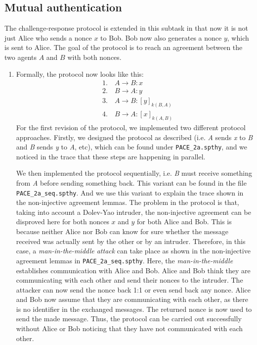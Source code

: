 \documentclass[a4paper,11pt]{scrartcl}
\begin{document}
\subsection{Mutual authentication}
The challenge-response protocol is extended in this subtask in that now it is not just Alice who sends a nonce $x$ to Bob.  Bob now also generates a nonce $y$,  which is sent to Alice. The goal of the protocol is to reach an agreement between the two agents $A$ and $B$ with both nonces.
\begin{enumerate}[label=\alph*)]
	\item Formally, the protocol now looks like this:
\begin{align*}
&\text{1.} \quad A \rightarrow B: x\\
&\text{2.} \quad B \rightarrow A: y\\
&\text{3.} \quad A \rightarrow B: [y]_{k(B,A)}\\
&\text{4.} \quad B \rightarrow A: [x]_{k(A,B)}
\end{align*}
For the first revision of the protocol, we implemented two different protocol approaches. Firstly, we designed the protocol as described (i.e. \emph{A} sends \emph{x} to \emph{B} and \emph{B} sends \emph{y} to \emph{A}, etc), which can be found under \texttt{PACE\_2a.spthy}, and we noticed in the trace that these steps are happening in parallel. 

We then implemented the protocol sequentially, i.e. \emph{B} must receive something from \emph{A} before sending something back. This variant can be found in the file \texttt{PACE\_2a\_seq.spthy}. And we use this variant to explain the trace shown in the non-injective agreement lemmas. \newline
The problem in the protocol is that,  taking into account a Dolev-Yao intruder,  the non-injective agreement can be disproved here for both nonces $x$ and $y$ for both Alice and Bob. This is because neither Alice nor Bob can know for sure whether the message received was actually sent by the other or by an intruder.  Therefore, in this case,  a \textit{man-in-the-middle attack} can take place as shown in the non-injective agreement lemmas in \texttt{PACE\_2a\_seq.spthy}.  \newline
Here, the \textit{man-in-the-middle} establishes communication with Alice and Bob.  Alice and Bob think they are communicating with each other and send their nonces to the intruder. The attacker can now send the nonce back 1:1 or even send back any nonce.  Alice and Bob now assume that they are communicating with each other,  as there is no identifier in the exchanged messages.  The returned nonce is now used to send the made message.  Thus,  the protocol can be carried out successfully without Alice or Bob noticing that they have not communicated with each other.


\end{enumerate}
\end{document}
